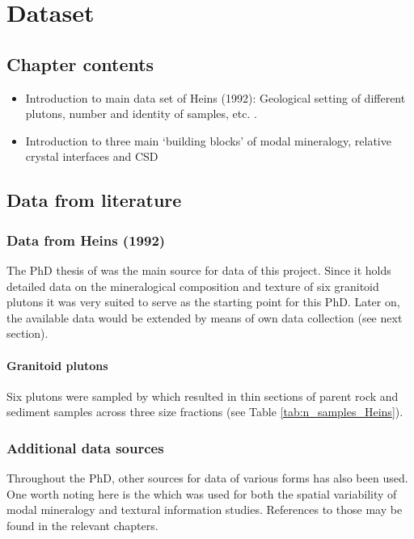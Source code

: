 \chapter{Dataset}\label{ch:dataset}

\section{Chapter contents}
\begin{itemize}
    \item Introduction to main data set of Heins (1992): Geological setting of different plutons, number and identity of samples, etc. . %
    \item Introduction to three main ‘building blocks’ of modal mineralogy, relative crystal interfaces and CSD
\end{itemize}

\section{Data from literature}
    \subsection{Data from Heins (1992)}
        The PhD thesis of \Textcite{Heins_1992} was the main source for data of this project. %
        Since it holds detailed data on the mineralogical composition and texture of six granitoid plutons it was very suited to serve as the starting point for this PhD. %
        Later on, the available data would be extended by means of own data collection (see next section). %

        \subsubsection{Granitoid plutons}
        Six plutons were sampled by \Textcite{Heins_1992} which resulted in  thin sections of parent rock and  sediment samples across three size fractions (see Table \ref{tab:n_samples_Heins}). %

            

    \subsection{Additional data sources}
        Throughout the PhD, other sources for data of various forms has also been used. %
        One worth noting here is the \Textcite{Vistelius_et_al_1983} which was used for both the spatial variability of modal mineralogy and textural information studies. %
        References to those may be found in the relevant chapters. %

